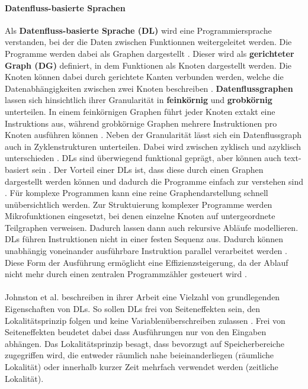 \documentclass{article}
\begin{document}
    \paragraph{Datenfluss-basierte Sprachen}
    Als \textbf{Datenfluss-basierte Sprache (DL)} wird eine Programmiersprache verstanden, bei der die Daten zwischen Funktionnen weitergeleitet werden. 
    Die Programme werden dabei als Graphen dargestellt \cite{11}.
    Dieser wird als \textbf{gerichteter Graph (DG)} definiert, in dem Funktionen als Knoten dargestellt werden.
    Die Knoten können dabei durch gerichtete Kanten verbunden werden, welche die Datenabhängigkeiten zwischen zwei Knoten beschreiben \cite{2}.
    \textbf{Datenflussgraphen} lassen sich hinsichtlich ihrer Granularität in \textbf{feinkörnig} und \textbf{grobkörnig} unterteilen. In einem feinkörnigen Graphen führt jeder Knoten extakt eine Instruktions aus, während grobkörnige Graphen mehrere Instruktionen pro Knoten ausführen können \cite{1}.
    Neben der Granularität lässt sich ein Datenflussgraph auch in Zyklenstrukturen unterteilen. 
    Dabei wird zwischen zyklisch und azyklisch unterschieden \cite{8}.
    DLs sind überwiegend funktional geprägt, aber können auch text-basiert sein \cite{2}.
    Der Vorteil einer DLs ist, dass diese durch einen Graphen dargestellt werden können \cite{11} und dadurch die Programme einfach zur verstehen sind \cite{6}.
    Für komplexe Programmen kann eine reine Graphendarstellung schnell unübersichtlich werden. Zur Struktuierung komplexer Programme werden Mikrofunktionen eingesetzt, bei denen einzelne Knoten auf untergeordnete Teilgraphen verweisen. Dadurch lassen dann auch rekursive Abläufe modellieren. \cite{11}    
    DLs führen Instruktionen nicht in einer festen Sequenz aus. Dadurch können unabhängig voneinander ausführbare Instruktion parallel verarbeitet werden \cite{1}.
    Diese Form der Ausführung ermöglicht eine Effizienzsteigerung, da der Ablauf nicht mehr durch einen zentralen Programmzähler gesteuert wird \cite{2}.\\
    \\
    Johnston et al. beschreiben in ihrer Arbeit eine Vielzahl von grundlegenden Eigenschaften von DLs. 
    So sollen DLs frei von Seiteneffekten sein, den Lokalitätsprinzip folgen und keine Variablenüberschreiben zulassen \cite{2}.
    Frei von Seiteneffekten beudetet dabei dass Ausführungen nur von den Eingaben abhängen.
    Das Lokalitätsprinzip besagt, dass bevorzugt auf Speicherbereiche zugegriffen wird, die entweder räumlich nahe beieinanderliegen (räumliche Lokalität) oder innerhalb kurzer Zeit mehrfach verwendet werden (zeitliche Lokalität).\\
\end{document}
